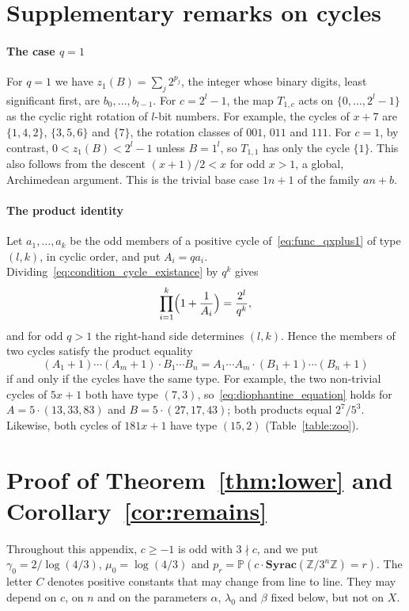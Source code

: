 \documentclass[12pt]{amsart}
\theoremstyle{definition}
\theoremstyle{remark}
\begin{document}
\section{Supplementary remarks on cycles}
\label{appx:cycles}
\paragraph{The case $q=1$} For $q=1$ we have $z_1(B)=\sum_j 2^{p_j}$, the integer whose binary digits, least significant first, are $b_0,\ldots,b_{l-1}$. For $c=2^l-1$, the map $T_{1,c}$ acts on $\{0,\ldots,2^l-1\}$ as the cyclic right rotation of $l$-bit numbers. For example, the cycles of $x+7$ are $\{1,4,2\}$, $\{3,5,6\}$ and $\{7\}$, the rotation classes of $001$, $011$ and $111$. For $c=1$, by contrast, $0<z_1(B)<2^l-1$ unless $B=1^l$, so $T_{1,1}$ has only the cycle $\{1\}$. This also follows from the descent $(x+1)/2<x$ for odd $x>1$, a global, Archimedean argument. This is the trivial base case $1n+1$ of the family $an+b$.

\paragraph{The product identity}
Let $a_1,\ldots,a_k$ be the odd members of a positive cycle of~\eqref{eq:func_qxplus1} of type $(l,k)$, in cyclic order, and put $A_i=qa_i$. Dividing~\eqref{eq:condition_cycle_existance} by $q^k$ gives
\[
\prod_{i=1}^{k}\Bigl(1+\frac1{A_i}\Bigr)=\frac{2^l}{q^k},
\]
and for odd $q>1$ the right-hand side determines $(l,k)$. Hence the members of two cycles satisfy the product equality
\begin{equation}
\label{eq:diophantine_equation}
(A_1+1)\cdots(A_m+1)\cdot B_1\cdots B_n=A_1\cdots A_m\cdot(B_1+1)\cdots(B_n+1)
\end{equation}
if and only if the cycles have the same type. For example, the two non-trivial cycles of $5x+1$ both have type $(7,3)$, so~\eqref{eq:diophantine_equation} holds for $A=5\cdot(13,33,83)$ and $B=5\cdot(27,17,43)$; both products equal $2^7/5^3$. Likewise, both cycles of $181x+1$ have type $(15,2)$ (Table~\ref{table:zoo}).

\section{Proof of Theorem~\ref{thm:lower} and Corollary~\ref{cor:remains}}
\label{appx:lower}

Throughout this appendix, $c\ge-1$ is odd with $3\nmid c$, and we put $\gamma_0=2/\log(4/3)$, $\mu_0=\log(4/3)$ and $p_r=\mathbb P(c\cdot\mathbf{Syrac}(\mathbb Z/3^n\mathbb Z)=r)$. The letter $C$ denotes positive constants that may change from line to line. They may depend on $c$, on $n$ and on the parameters $\alpha$, $\lambda_0$ and $\beta$ fixed below, but not on $X$.
\end{document}
